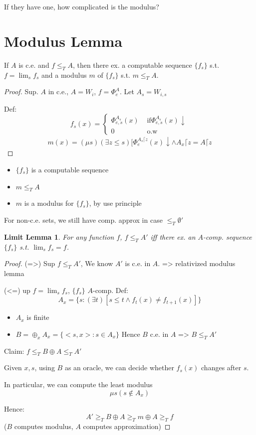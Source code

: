 \documentclass[12pt]{article}
\begin{document}
If they have one, how complicated is the modulus?

\section*{Modulus Lemma}
If $A$ is c.e. and $f \le_T A$, then there ex. a computable sequence
$\{ f_s\}$ s.t. $f = \lim_s f_s$ 
and a modulus $m$ of $\{ f_s\}$ s.t. $m \le_T A$.
\begin{proof}
 Sup. $A$ in c.e., $A = W_i$, $f = \Phi^A_e$.
Let $A_s = W_{i,s}$

Def:
\[
 f_s(x) = \begin{cases}
           \Phi^{A_s}_{e,s}(x)	&\text{ if} \Phi^{A_s}_{e,s}(x) \downarrow \\
           0			&\text{ o.w}
          \end{cases}
\]
\begin{align*}
 m(x) = (\mu s)(\exists z \le s) [ \Phi^{A_s \lceil z}_e (x) \downarrow \wedge A_x\lceil z = A \lceil z
\end{align*}
\end{proof}
\begin{itemize}
 \item $\{f_s\}$ is a computable sequence
 \item $m \le_T A$
 \item $m$ is a modulus for $\{f_s\}$, by use principle
\end{itemize}
For non-c.e. sets, we still have comp. approx in case $\le_T \emptyset'$

\newtheorem*{limitlemma}{Limit Lemma}
\begin{limitlemma}
 For any function $f$,
$f \le_T A'$ iff there ex. an $A$-comp. sequence
$\{f_s\}$ s.t. $\lim_s f_s = f$.
\end{limitlemma}
\begin{proof}
 (=>) Sup $f \le_T A'$, We know $A'$ is c.e. in $A$.
	=> relativized modulus lemma

 (<=) up $f = \lim_s f_s$, $\{f_s\}$ $A$-comp.
Def: 
\[
 A_x = \{ s : (\exists t) [ s \le t \wedge f_t(x) \ne f_{t+1}(x) ] \}
\] %

\begin{itemize}
 \item $A_x$ is finite
 \item $B = \oplus_x A_x = \{ <s,x> : s \in A_x \}$
	Hence $B$ c.e. in $A$
	=> $B \le_T A'$
\end{itemize}

Claim: $f \le_T B \oplus A \le_T A'$

Given $x,s$, using $B$ as an oracle, we can decide whether $f_s(x)$ changes after $s$.

In particular, we can compute the least modulus 
\[
 \mu s (s \not\in A_x)
\]

Hence: \[
A' \ge_T B \oplus A \ge_T m \oplus A \ge_T f
       \]
($B$ computes modulus, $A$ computes approximation)
\end{proof}
\end{document}
